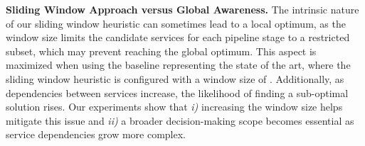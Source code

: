 \noindent\textbf{Sliding Window Approach versus Global Awareness.} The intrinsic nature of our sliding window heuristic can sometimes lead to a local optimum, as the window size limits the candidate services for each pipeline stage to a restricted subset, which may prevent reaching the global optimum. This aspect is maximized when using the baseline representing the state of the art, where the sliding window heuristic is configured with a window size of . Additionally, as dependencies between services increase, the likelihood of finding a sub-optimal solution rises. Our experiments show that \emph{i)} increasing the window size helps mitigate this issue and \emph{ii)} a broader decision-making scope becomes essential as service dependencies grow more complex.

